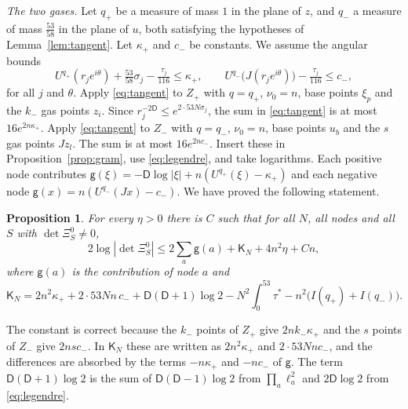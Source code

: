 \documentclass[11pt]{amsart}
\newtheorem{proposition}[theorem]{Proposition}
\theoremstyle{definition}
\theoremstyle{remark}
\numberwithin{equation}{section}
\begin{document}
\emph{The two gases.} Let $q_+$ be a measure of mass $1$ in the plane of $z$, and $q_-$ a measure of mass $\frac{53}{58}$ in the plane of
$u$, both satisfying the hypotheses of Lemma~\ref{lem:tangent}. Let $\kappa_+$ and $c_-$ be constants. We assume the angular bounds
\begin{equation}\label{eq:angular}
 U^{q_+}(r_je^{i\theta})+\tfrac{53}{58}\sigma_j-\tfrac{\tau_j}{116}\le\kappa_+,\qquad
 U^{q_-}\bigl(J(r_je^{i\theta})\bigr)-\tfrac{\tau_j}{116}\le c_-,
\end{equation}
for all $j$ and $\theta$. Apply \eqref{eq:tangent} to $Z_+$ with $q=q_+$, $\nu_0=n$, base points $\xi_p$ and the $k_-$ gas points $z_i$. Since
$r_j^{-2\mathsf D}\le e^{2\cdot53N\sigma_j}$, the sum in \eqref{eq:tangent} is at most $16e^{2n\kappa_+}$. Apply \eqref{eq:tangent} to $Z_-$ with $q=q_-$,
$\nu_0=n$, base points $u_b$ and the $s$ gas points $Jz_l$. The sum is at most $16e^{2nc_-}$. Insert these in
Proposition~\ref{prop:gram}, use \eqref{eq:legendre}, and take logarithms. Each positive node contributes
$\mathsf g(\xi)=-\mathsf D\log|\xi|+n(U^{q_+}(\xi)-\kappa_+)$ and each negative node $\mathsf g(x)=n(U^{q_-}(Jx)-c_-)$. We have proved the following statement.

\begin{proposition}\label{prop:gas}
For every $\eta>0$ there is $C$ such that for all $N$, all nodes and all $S$ with $\det\Xi^0_S\ne0$,
\[
 2\log|\det\Xi^0_S|\le2\sum_a\mathsf g(a)+\mathsf K_N+4n^2\eta+Cn,
\]
where $\mathsf g(a)$ is the contribution of node $a$ and
\[
 \mathsf K_N=2n^2\kappa_++2\cdot53Nn\,c_-+\mathsf D(\mathsf D+1)\log2-N^2\int_0^{53}\tau^*-n^2\bigl(I(q_+)+I(q_-)\bigr).
\]
\end{proposition}

The constant is correct because the $k_-$ points of $Z_+$ give $2nk_-\kappa_+$ and the $s$ points of $Z_-$ give $2nsc_-$. In $\mathsf K_N$ these are
written as $2n^2\kappa_+$ and $2\cdot53Nnc_-$, and the differences are absorbed by the terms $-n\kappa_+$ and $-nc_-$ of $\mathsf g$. The term $\mathsf D(\mathsf D+1)\log2$
is the sum of $\mathsf D(\mathsf D-1)\log2$ from $\prod_a\ell_a^2$ and $2\mathsf D\log2$ from \eqref{eq:legendre}.
\end{document}
